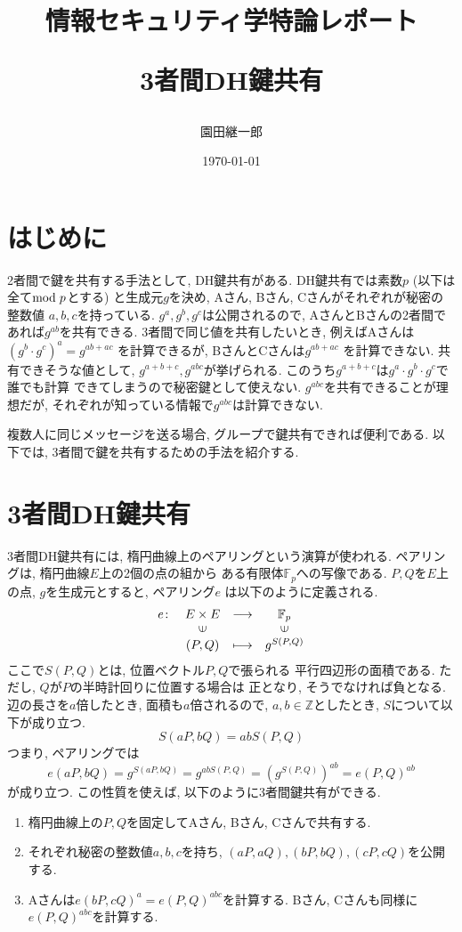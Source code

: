 \documentclass[a4paper,11pt]{jsarticle}
\begin{document}
\title{情報セキュリティ学特論レポート

3者間DH鍵共有}
\author{園田継一郎}
\date{\today}
\maketitle

\section{はじめに}
2者間で鍵を共有する手法として, DH鍵共有がある.
DH鍵共有では素数$p$ (以下は全て${\rm mod}\hspace{3pt} p$とする)
と生成元$g$を決め, 
Aさん, Bさん, Cさんがそれぞれが秘密の整数値
$a, b, c$を持っている.
$g^a, g^b, g^c$は公開されるので, 
AさんとBさんの2者間であれば$g^{ab}$を共有できる.
3者間で同じ値を共有したいとき,
例えばAさんは$(g^b \cdot g^c)^a = g^{ab + ac}$
を計算できるが, BさんとCさんは$g^{ab + ac}$
を計算できない.
共有できそうな値として, $g^{a + b + c}, g^{abc}$が挙げられる.
このうち$g^{a + b + c}$は$g^a \cdot g^b \cdot g^c$で誰でも計算
できてしまうので秘密鍵として使えない.
$g^{abc}$を共有できることが理想だが, 
それぞれが知っている情報で$g^{abc}$は計算できない.

複数人に同じメッセージを送る場合,
グループで鍵共有できれば便利である.
以下では, 3者間で鍵を共有するための手法を紹介する.

\section{3者間DH鍵共有}
3者間DH鍵共有には, 楕円曲線上のペアリングという演算が使われる.
ペアリングは, 楕円曲線$E$上の2個の点の組から
ある有限体$\mathbb{F}_p$への写像である\cite{bib1}.
$P, Q$を$E$上の点, $g$を生成元とすると, ペアリング$e$
は以下のように定義される.
\[
  \begin{array}{rccc}
    e \colon & E \times E & \longrightarrow & \mathbb{F}_p \\
            & \rotatebox{90}{$\in$} & & \rotatebox{90}{$\in$} \\
            & (P, Q) & \longmapsto & g^{S(P, Q)}
  \end{array}
\]
ここで$S(P, Q)$とは, 位置ベクトル$P, Q$で張られる
平行四辺形の面積である. ただし, $Q$が$P$の半時計回りに位置する場合は
正となり, そうでなければ負となる. 辺の長さを$a$倍したとき, 
面積も$a$倍されるので, $a, b \in \mathbb{Z}$としたとき, 
$S$について以下が成り立つ. 
\[
  S(aP, bQ) = abS(P, Q)
\]
つまり, ペアリングでは
\[
  e(aP, bQ) = g^{S(aP, bQ)} = g^{abS(P, Q)} =
  \left(g^{S(P, Q)}\right)^{ab} = e(P, Q)^{ab}
\]
が成り立つ. この性質を使えば, 以下のように3者間鍵共有ができる.
\begin{enumerate}
  \item 楕円曲線上の$P, Q$を固定してAさん, Bさん, Cさんで共有する.
  \item それぞれ秘密の整数値$a, b, c$を持ち, $(aP, aQ), (bP, bQ), (cP, cQ)$を公開する.
  \item Aさんは$e(bP, cQ)^a = e(P, Q)^{abc}$を計算する.
    Bさん, Cさんも同様に$e(P, Q)^{abc}$を計算する.
\end{enumerate}
\end{document}
